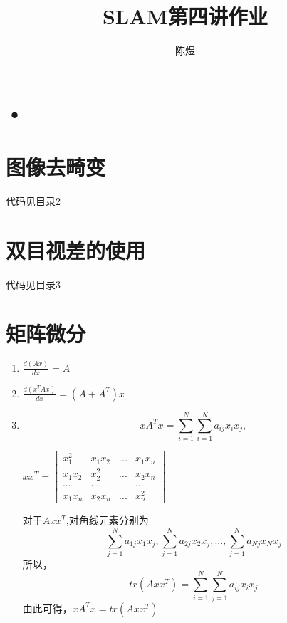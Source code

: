 \documentclass[a4paper, 12pt]{ctexart}
\author{陈煜}
\title{SLAM第四讲作业}
\begin{document}
\maketitle

\section{•}

\section{图像去畸变}
代码见目录2

\section{双目视差的使用}
代码见目录3

\section{矩阵微分}

\begin{enumerate}
    \item $\frac{d(Ax)}{dx} = A $
    \item $\frac{d(x^TAx)}{dx} = (A + A^T)x $
    \item $$xA^Tx = \sum_{i=1}^N \sum_{i=1}^N a_{ij}x_ix_j,$$
    
		$
			xx^T = 
			\left[
			\begin{array}{cccc}
			x_1^2 & x_1x_2 & ... & x_1x_n \\
			x_1x_2 & x_2^2 & ... & x_2x_n \\
			... & ... &   & ...\\
			x_1x_n & x_2x_n & ... & x_n^2
			\end{array}
			\right]
		$   
		
		对于$Axx^T$,对角线元素分别为
		$$\sum_{j=1}^N a_{1j}x_1x_j, \sum_{j=1}^N a_{2j}x_2x_j, ... , \sum_{j=1}^N a_{Nj}x_Nx_j$$
		所以，$$ tr(Axx^T) = \sum_{i=1}^N \sum_{j=1}^N a_{ij}x_ix_j$$
		由此可得，$xA^Tx = tr(Axx^T)$
    
    
\end{enumerate}
\end{document}
